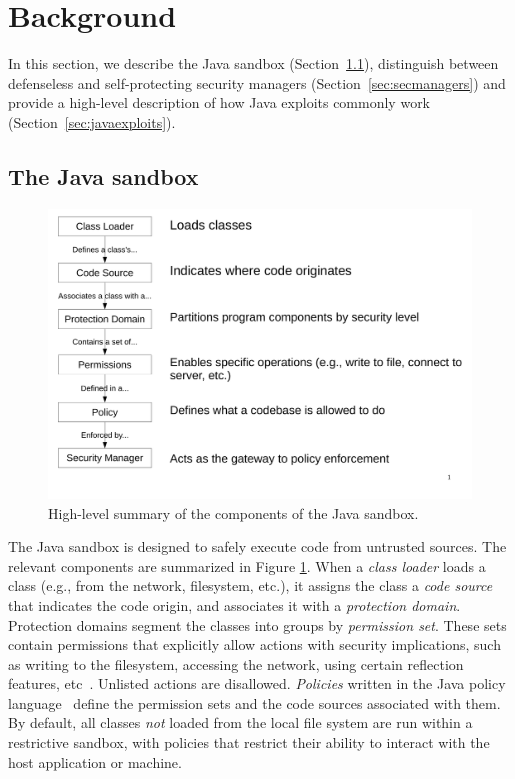 \documentclass{sig-alternate}
\begin{document}
\section{Background}\label{sec:Background}

In this section, we describe the Java sandbox
(Section~\ref{sec:sandbox}), distinguish between defenseless and self-protecting
security managers (Section~\ref{sec:secmanagers}) and provide a high-level
description of how Java exploits commonly work
(Section~\ref{sec:javaexploits}). 

\subsection{The Java sandbox}
\label{sec:sandbox}

\begin{figure}
\includegraphics[width=\columnwidth]{sandbox_overview}
\caption{High-level summary of the components of the Java 
\label{fig:Sandbox-high-level-summary}
sandbox.}
\end{figure}

The Java sandbox is designed to safely execute code from untrusted
sources. 
The relevant components are summarized in Figure
\ref{fig:Sandbox-high-level-summary}. 
When a \textit{class loader} loads a class (e.g., from
the network, filesystem, etc.), it assigns the class a \textit{code source} that
indicates the code origin, and associates it with a \textit{protection
  domain}. Protection domains segment the classes into groups by
\textit{permission set}. These sets
contain permissions that explicitly allow actions with security
implications, such as writing to the filesystem, accessing the network, using
certain reflection features, etc~\cite{_permissions_2014}.  Unlisted actions are disallowed.
\emph{Policies} written in the Java policy
language~\cite{_java_policy_language} define the permission sets and the code
sources associated with them. 
By default, all classes \emph{not} loaded from the local file system are run
within a restrictive sandbox, with policies that restrict their ability to
interact with the host application or machine. 
\end{document}

